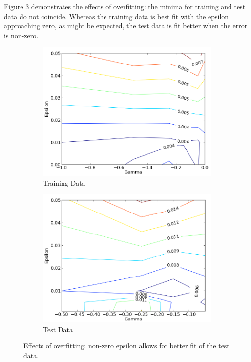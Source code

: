 \documentclass[12pt,notitlepage,twoside]{scrreprt}
\begin{document}
Figure \ref{overfit} demonstrates the effects of overfitting: the minima for training and
test data do not coincide. Whereas the training data is best fit with the epsilon
approaching zero, as might be expected, the test data is fit better when the error is
non-zero.

\begin{figure}[h]
\centering
\begin{subfigure}[b]{.49\textwidth}
  \centering
  \includegraphics[width=\linewidth]{figs/fine_tune_tr_zoom.png}
  \caption{Training Data}
  \label{coarse}
\end{subfigure}
\begin{subfigure}[b]{.49\textwidth}
  \centering
  \includegraphics[width=\linewidth]{figs/fine_tune_ts.png}
  \caption{Test Data}
  \label{fine}
\end{subfigure}
\caption{Effects of overfitting: non-zero epsilon allows for better fit of the test data.\label{overfit}}
\end{figure}
\end{document}
